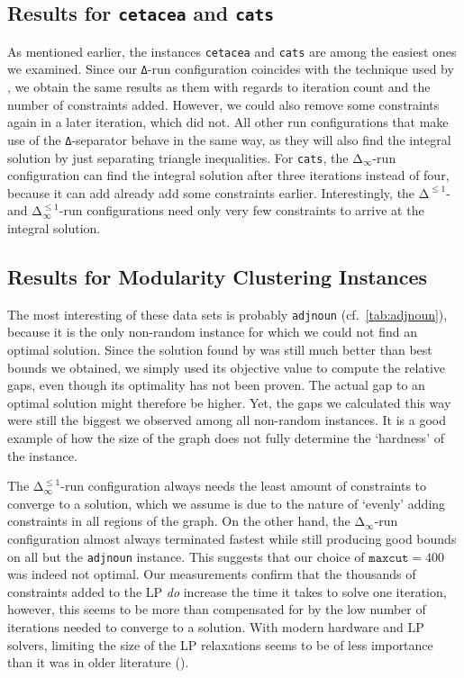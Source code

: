 \subsection{Results for \texttt{cetacea} and \texttt{cats}}
As mentioned earlier, the instances \texttt{cetacea} and \texttt{cats} are among the easiest ones we examined.
Since our \texttt{Δ}-run configuration coincides with the technique used by \cite{grotschelCuttingPlaneAlgorithm1989}, we obtain the same results as them with regards to iteration count and the number of constraints added.
However, we could also remove some constraints again in a later iteration, which \cite{grotschelCuttingPlaneAlgorithm1989} did not.
All other run configurations that make use of the \texttt{Δ}-separator behave in the same way, as they will also find the integral solution by just separating triangle inequalities.
For \texttt{cats}, the $\texttt{Δ}_{\infty}$-run configuration can find the integral solution after three iterations instead of four, because it can add already add some constraints earlier.
Interestingly, the $\texttt{Δ}^{\leq 1}$- and $\texttt{Δ}_{\infty}^{\leq 1}$-run configurations need only very few constraints to arrive at the integral solution.

\subsection{Results for Modularity Clustering Instances}
The most interesting of these data sets is probably \texttt{adjnoun} (cf.\ \cref{tab:adjnoun}), because it is the only non-random instance for which we could not find an optimal solution.
Since the solution found by \cite{kappesComparativeStudyModern2015} was still much better than best bounds we obtained,
we simply used its objective value to compute the relative gaps, even though its optimality has not been proven.
The actual gap to an optimal solution might therefore be higher.
Yet, the gaps we calculated this way were still the biggest we observed among all non-random instances.
It is a good example of how the size of the graph does not fully determine the ‘hardness’ of the instance.

The $\texttt{Δ}_{\infty}^{\leq 1}$-run configuration always needs the least amount of constraints to converge to a solution, which we assume is due to the nature of ‘evenly’ adding constraints in all regions of the graph.
On the other hand, the $\texttt{Δ}_{\infty}$-run configuration almost always terminated fastest while still producing good bounds on all but the \texttt{adjnoun} instance.
This suggests that our choice of $\texttt{maxcut} = 400$ was indeed not optimal.
Our measurements confirm that the thousands of constraints added to the LP \textit{do} increase the time it takes to solve one iteration, however, this seems to be more than compensated for by the low number of iterations needed to converge to a solution.
With modern hardware and LP solvers, limiting the size of the LP relaxations seems to be of less importance than it was in older literature (\eg \cite{grotschelCuttingPlaneAlgorithm1989}).

